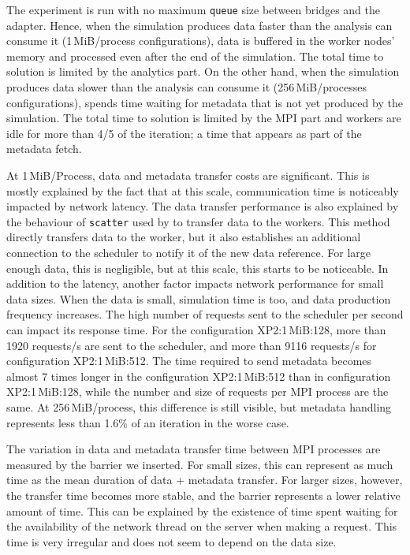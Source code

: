 The experiment is run with no maximum \verb|queue| size between \deisa bridges and the adapter.
Hence, when the simulation produces data faster than the analysis can consume it (1\,MiB/process configurations), data is buffered in the worker nodes' memory and processed even after the end of the simulation.
The total time to solution is limited by the analytics part. On the other hand, when the simulation produces data slower than the analysis can consume it (256\,MiB/processes configurations), \dask spends time waiting for metadata that is not yet produced by the simulation.
The total time to solution is limited by the MPI part and \dask workers are idle for more than 4/5 of the iteration; a time that appears as part of the metadata fetch.

At 1\,MiB/Process, data and metadata transfer costs are significant. This is mostly explained by the fact that at this scale, communication time is noticeably impacted by network latency. The data transfer performance is also explained by the behaviour of \dask \verb|scatter| used by \deisa to transfer data to the workers. 
This method directly transfers data to the worker, but it also establishes an additional connection to the scheduler to notify it of the new data reference.
For large enough data, this is negligible, but at this scale, this starts to be noticeable. 
In addition to the latency, another factor impacts network performance for small data sizes.
When the data is small, simulation time is too, and data production frequency increases.
The high number of requests sent to the scheduler per second can impact its response time.
For the configuration XP2:1\,MiB:128, more than 1920 requests/s are sent to the scheduler, and more than 9116 requests/s for configuration XP2:1\,MiB:512.
The time required to send metadata becomes almost 7 times longer in the configuration XP2:1\,MiB:512 than in configuration XP2:1\,MiB:128, while the number and size of requests per MPI process are the same.
At 256\,MiB/process, this difference is still visible, but metadata handling represents less than 1.6\% of an iteration in the worse case.

The variation in data and metadata transfer time between MPI processes are measured by the barrier we inserted.
For small sizes, this can represent as much time as the mean duration of data + metadata transfer.
For larger sizes, however, the transfer time becomes more stable, and the barrier represents a lower relative amount of time.
This can be explained by the existence of time spent waiting for the availability of the \dask network thread on the server when making a request.
This time is very irregular and does not seem to depend on the data size.

